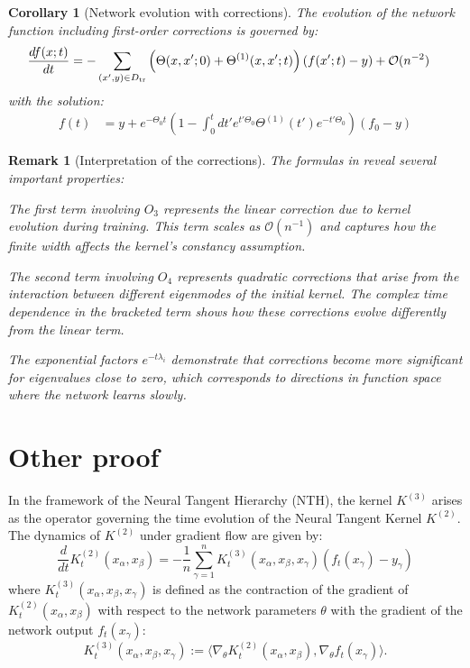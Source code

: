 \documentclass[11pt,a4paper]{article}
\newtheorem{corollary}[theorem]{Corollary}
\newtheorem{remark}[theorem]{Remark}
\theoremstyle{definition}
\begin{document}
\begin{corollary}[Network evolution with corrections]\label{cor:network_evolution}
The evolution of the network function including first-order corrections is governed by:
\begin{align}
\frac{df(x;t)}{dt} &= -\sum_{(x',y)\in D_{\rm tr}}\left(\Theta(x,x';0)+\Theta^{(1)}(x,x';t)\right)\left(f(x';t)-y\right) + \mathcal{O}(n^{-2}) \label{eq:evolution_ode}
\end{align}
with the solution:
\begin{align}
f(t) &= y + e^{-\Theta_{0}t}\left(1-\int_{0}^{t}dt'e^{t'\Theta_{0}}\Theta^{(1)}(t')e^{-t'\Theta_{0}}\right)\left(f_{0}-y\right) \label{eq:evolution_solution}
\end{align}
\end{corollary}

\begin{remark}[Interpretation of the corrections]
The formulas in  reveal several important properties:

The first term involving $O_3$ represents the linear correction due to kernel evolution during training. This term scales as $\mathcal{O}(n^{-1})$ and captures how the finite width affects the kernel's constancy assumption.

The second term involving $O_4$ represents quadratic corrections that arise from the interaction between different eigenmodes of the initial kernel. The complex time dependence in the bracketed term shows how these corrections evolve differently from the linear term.

The exponential factors $e^{-t\lambda_i}$ demonstrate that corrections become more significant for eigenvalues close to zero, which corresponds to directions in function space where the network learns slowly.
\end{remark}

\newpage

\section{Other proof}

In the framework of the Neural Tangent Hierarchy (NTH), the kernel $K^{(3)}$ arises as the operator governing the time evolution of the Neural Tangent Kernel $K^{(2)}$. The dynamics of $K^{(2)}$ under gradient flow are given by:
\begin{equation}
\frac{d}{dt} K^{(2)}_t(x_\alpha, x_\beta) = -\frac{1}{n} \sum_{\gamma=1}^n K^{(3)}_t(x_\alpha, x_\beta, x_\gamma) (f_t(x_\gamma) - y_\gamma)
\end{equation}
where $K^{(3)}_t(x_\alpha, x_\beta, x_\gamma)$ is defined as the contraction of the gradient of $K^{(2)}_t(x_\alpha, x_\beta)$ with respect to the network parameters $\theta$ with the gradient of the network output $f_t(x_\gamma)$:
\begin{equation}
K^{(3)}_t(x_\alpha, x_\beta, x_\gamma) := \langle \nabla_\theta K^{(2)}_t(x_\alpha, x_\beta), \nabla_\theta f_t(x_\gamma) \rangle.
\end{equation}
\end{document}
